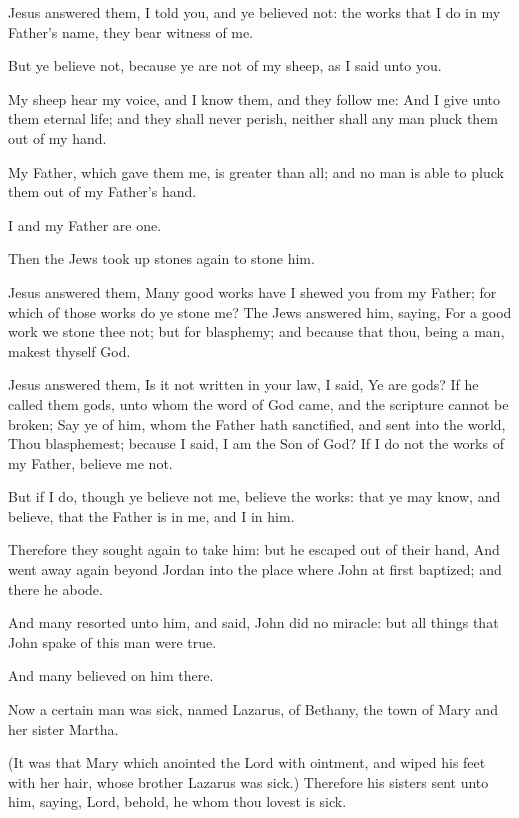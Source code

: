 \Verse Jesus answered them, I told you, and ye believed not: the works that I do in my Father's name, they bear witness of me.

\Verse But ye believe not, because ye are not of my sheep, as I said unto you.

\Verse My sheep hear my voice, and I know them, and they follow me: \Verse And I give unto them eternal life; and they shall never perish, neither shall any man pluck them out of my hand.

\Verse My Father, which gave them me, is greater than all; and no man is able to pluck them out of my Father's hand.

\Verse I and my Father are one.

\Verse Then the Jews took up stones again to stone him.

\Verse Jesus answered them, Many good works have I shewed you from my Father; for which of those works do ye stone me?  \Verse The Jews answered him, saying, For a good work we stone thee not; but for blasphemy; and because that thou, being a man, makest thyself God.

\Verse Jesus answered them, Is it not written in your law, I said, Ye are gods?  \Verse If he called them gods, unto whom the word of God came, and the scripture cannot be broken; \Verse Say ye of him, whom the Father hath sanctified, and sent into the world, Thou blasphemest; because I said, I am the Son of God?  \Verse If I do not the works of my Father, believe me not.

\Verse But if I do, though ye believe not me, believe the works: that ye may know, and believe, that the Father is in me, and I in him.

\Verse Therefore they sought again to take him: but he escaped out of their hand, \Verse And went away again beyond Jordan into the place where John at first baptized; and there he abode.

\Verse And many resorted unto him, and said, John did no miracle: but all things that John spake of this man were true.

\Verse And many believed on him there.


\Chapter
\Verse Now a certain man was sick, named Lazarus, of Bethany, the town of Mary and her sister Martha.

\Verse (It was that Mary which anointed the Lord with ointment, and wiped his feet with her hair, whose brother Lazarus was sick.)  \Verse Therefore his sisters sent unto him, saying, Lord, behold, he whom thou lovest is sick.

